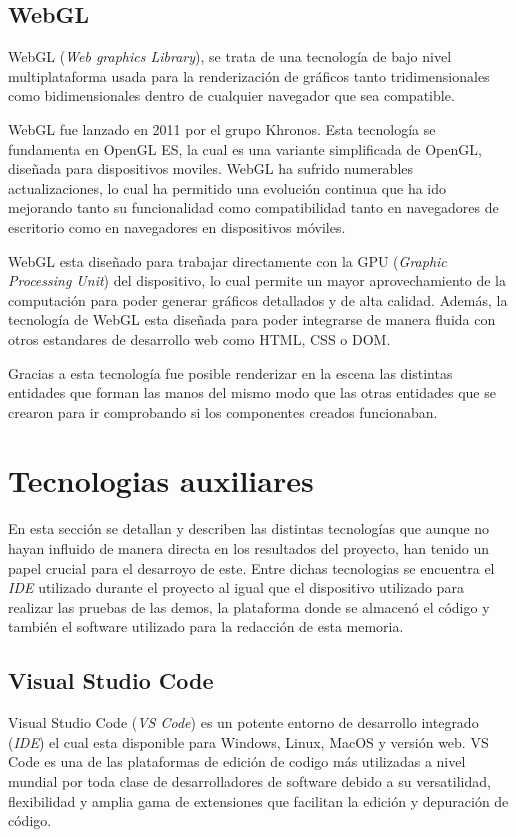 \documentclass[a4paper, 12pt]{book}
\begin{document}
\subsection{WebGL}
\label{subsec:WebGL}
WebGL \cite{webgl_encodebiz} (\textit{Web graphics Library}), se trata de una tecnología de bajo nivel multiplataforma usada para la renderización de gráficos tanto tridimensionales como bidimensionales dentro de cualquier navegador que sea compatible.

WebGL fue lanzado en 2011 por el grupo Khronos. Esta tecnología se fundamenta en OpenGL ES, la cual es una variante simplificada de OpenGL, diseñada para dispositivos moviles. WebGL ha sufrido numerables actualizaciones, 
lo cual ha permitido una evolución continua que ha ido mejorando tanto su funcionalidad como compatibilidad tanto en navegadores de escritorio como en navegadores en dispositivos móviles. 

WebGL esta diseñado para trabajar directamente con la GPU (\textit{Graphic Processing Unit}) del dispositivo, lo cual permite un mayor aprovechamiento de la computación para poder generar gráficos detallados y de alta calidad. 
Además, la tecnología de WebGL esta diseñada para poder integrarse de manera fluida con otros estandares de desarrollo web como HTML, CSS o DOM. 

Gracias a esta tecnología fue posible renderizar en la escena las distintas entidades que forman las manos del mismo modo que las otras entidades que se crearon para ir comprobando si los componentes creados funcionaban.
\section{Tecnologias auxiliares}
\label{sec:tecnologias-auxiliares}
En esta sección se detallan y describen las distintas tecnologías que aunque no hayan influido de manera directa en los resultados del proyecto, han tenido un papel crucial para el desarroyo de este.
Entre dichas tecnologias se encuentra el \textit{IDE} utilizado durante el proyecto al igual que el dispositivo utilizado para realizar las pruebas de las demos, la plataforma donde se almacenó el código y también el software utilizado para la redacción de esta memoria.


\subsection{Visual Studio Code}
\label{subsec: visualstudiocode}

Visual Studio Code (\textit{VS Code}) es un potente entorno de desarrollo integrado (\textit{IDE}) el cual esta disponible para Windows, Linux, MacOS y versión web. VS Code es una de las plataformas de edición de codigo más utilizadas a nivel mundial 
por toda clase de desarrolladores de software debido a su versatilidad, flexibilidad y amplia gama de extensiones que facilitan la edición y depuración de código.
\end{document}
